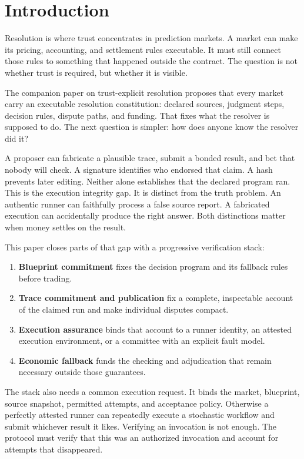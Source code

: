 \section{Introduction}

Resolution is where trust concentrates in prediction markets. A market can make its pricing, accounting, and settlement rules executable. It must still connect those rules to something that happened outside the contract. The question is not whether trust is required, but whether it is visible.

The companion paper on trust-explicit resolution \cite{trustexplicit2026} proposes that every market carry an executable resolution constitution: declared sources, judgment steps, decision rules, dispute paths, and funding. That fixes what the resolver is supposed to do. The next question is simpler: how does anyone know the resolver did it?

A proposer can fabricate a plausible trace, submit a bonded result, and bet that nobody will check. A signature identifies who endorsed that claim. A hash prevents later editing. Neither alone establishes that the declared program ran. This is the execution integrity gap. It is distinct from the truth problem. An authentic runner can faithfully process a false source report. A fabricated execution can accidentally produce the right answer. Both distinctions matter when money settles on the result.

This paper closes parts of that gap with a progressive verification stack:
\begin{enumerate}
\item \textbf{Blueprint commitment} fixes the decision program and its fallback rules before trading.
\item \textbf{Trace commitment and publication} fix a complete, inspectable account of the claimed run and make individual disputes compact.
\item \textbf{Execution assurance} binds that account to a runner identity, an attested execution environment, or a committee with an explicit fault model.
\item \textbf{Economic fallback} funds the checking and adjudication that remain necessary outside those guarantees.
\end{enumerate}

The stack also needs a common execution request. It binds the market, blueprint, source snapshot, permitted attempts, and acceptance policy. Otherwise a perfectly attested runner can repeatedly execute a stochastic workflow and submit whichever result it likes. Verifying an invocation is not enough. The protocol must verify that this was an authorized invocation and account for attempts that disappeared.

